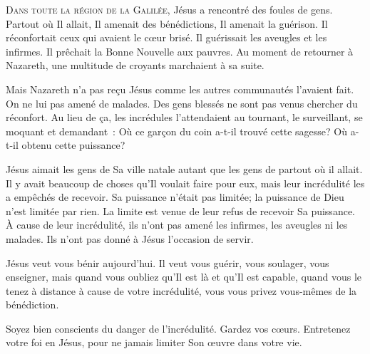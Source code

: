\dvrule






\lettrine{D}{ans toute la région de la Galilée,}
 Jésus a rencontré des foules de gens. Partout où Il allait,
 Il amenait des bénédictions, Il amenait la guérison.
 Il réconfortait ceux qui avaient le cœur brisé.
 Il guérissait les aveugles et les infirmes.
 Il prêchait la Bonne Nouvelle aux pauvres.
 Au moment de retourner à Nazareth, une multitude de croyants
 marchaient à sa suite.

Mais Nazareth n'a pas reçu Jésus comme les autres communautés
 l'avaient fait. On ne lui pas amené de malades.
 Des gens blessés ne sont pas venus chercher du réconfort.
 Au lieu de ça, les incrédules l'attendaient au tournant,
 le surveillant, se moquant et demandant~:
 \og Où ce garçon du coin a-t-il trouvé cette sagesse? \fg{}
 \og Où a-t-il obtenu cette puissance? \fg{}


Jésus aimait les gens de Sa ville natale autant que les gens
 de partout où il allait. Il y avait beaucoup de choses
 qu'Il voulait faire pour eux, mais leur incrédulité
 les a empêchés de recevoir. Sa puissance n'était pas limitée;
 la puissance de Dieu n'est limitée par rien.
 La limite est venue de leur refus de recevoir Sa puissance.
 À cause de leur incrédulité, ils n'ont pas amené les infirmes,
 les aveugles ni les malades. Ils n'ont pas donné à Jésus l'occasion de servir.

Jésus veut vous bénir aujourd'hui. Il veut vous guérir, vous soulager,
 vous enseigner, mais quand vous oubliez qu'Il est là et qu'Il est capable,
 quand vous le tenez à distance à cause de votre incrédulité,
 vous vous privez vous-mêmes de la bénédiction.

Soyez bien conscients du danger de l'incrédulité. Gardez vos cœurs.
 Entretenez votre foi en Jésus,
 pour ne jamais limiter Son œuvre dans votre vie.

\dvrule

